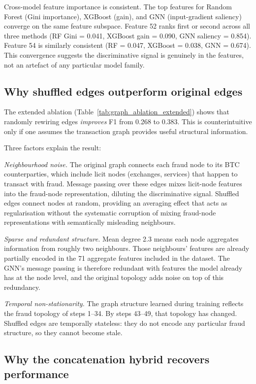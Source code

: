 Cross-model feature importance is consistent.  The top features for
Random Forest (Gini importance), XGBoost (gain), and GNN
(input-gradient saliency) converge on the same feature subspace.
Feature 52 ranks first or second across all three methods (RF Gini =
0.041, XGBoost gain = 0.090, GNN saliency = 0.854).  Feature 54 is
similarly consistent (RF = 0.047, XGBoost = 0.038, GNN = 0.674).
This convergence suggests the discriminative signal is genuinely in
the features, not an artefact of any particular model family.

\subsection{Why shuffled edges outperform original edges}
\label{sec:why_shuffled}

The extended ablation (Table~\ref{tab:graph_ablation_extended}) shows
that randomly rewiring edges \emph{improves} F1 from 0.268 to 0.383.
This is counterintuitive only if one assumes the transaction graph
provides useful structural information.

Three factors explain the result:

\textit{Neighbourhood noise.}  The original graph connects each fraud
node to its BTC counterparties, which include licit nodes (exchanges,
services) that happen to transact with fraud.  Message passing over
these edges mixes licit-node features into the fraud-node
representation, diluting the discriminative signal.  Shuffled edges
connect nodes at random, providing an averaging effect that acts as
regularisation without the systematic corruption of mixing fraud-node
representations with semantically misleading neighbours.

\textit{Sparse and redundant structure.}  Mean degree 2.3 means each
node aggregates information from roughly two neighbours.  Those
neighbours' features are already partially encoded in the 71 aggregate
features included in the dataset.  The GNN's message passing is
therefore redundant with features the model already has at the node
level, and the original topology adds noise on top of this redundancy.

\textit{Temporal non-stationarity.}  The graph structure learned
during training reflects the fraud topology of steps 1--34.  By
steps 43--49, that topology has changed.  Shuffled edges are
temporally stateless: they do not encode any particular fraud
structure, so they cannot become stale.

\subsection{Why the concatenation hybrid recovers performance}
\label{sec:why_hybrid}

